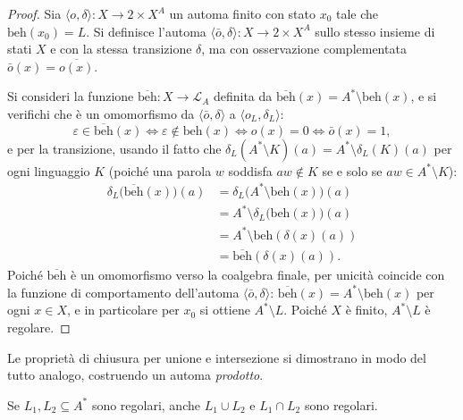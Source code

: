 \begin{proof}
  Sia \(\langle o, \delta \rangle : X \to 2 \times X^A\) un automa finito con stato \(x_0\) tale che \(\mathrm{beh}(x_0) = L\). Si definisce l'automa \(\langle \bar{o}, \delta \rangle : X \to 2 \times X^A\) sullo stesso insieme di stati \(X\) e con la stessa transizione \(\delta\), ma con osservazione complementata \(\bar{o}(x) = \overline{o(x)}\).

  Si consideri la funzione \(\overline{\mathrm{beh}} : X \to \mathcal{L}_A\) definita da \(\overline{\mathrm{beh}}(x) = A^* \setminus \mathrm{beh}(x)\), e si verifichi che è un omomorfismo da \(\langle \bar o, \delta \rangle\) a \(\langle o_L, \delta_L \rangle\):
  \[
    \varepsilon \in \overline{\mathrm{beh}}(x) \iff \varepsilon \notin \mathrm{beh}(x) \iff o(x) = 0 \iff \bar{o}(x) = 1,
  \]
  e per la transizione, usando il fatto che \(\delta_L(A^* \setminus K)(a) = A^* \setminus \delta_L(K)(a)\) per ogni linguaggio \(K\) (poiché una parola \(w\) soddisfa \(aw \notin K\) se e solo se \(aw \in A^* \setminus K\)):
  \[
    \begin{aligned}
      \delta_L\bigl(\overline{\mathrm{beh}}(x)\bigr)(a) & = \delta_L\bigl(A^* \setminus \mathrm{beh}(x)\bigr)(a) \\
                                                        & = A^* \setminus \delta_L\bigl(\mathrm{beh}(x)\bigr)(a) \\
                                                        & = A^* \setminus \mathrm{beh}(\delta(x)(a))             \\
                                                        & = \overline{\mathrm{beh}}(\delta(x)(a)).
    \end{aligned}
  \]
  Poiché \(\overline{\mathrm{beh}}\) è un omomorfismo verso la coalgebra finale, per unicità coincide con la funzione di comportamento dell'automa \(\langle \bar o, \delta \rangle\): \(\overline{\mathrm{beh}}(x) = A^* \setminus \mathrm{beh}(x)\) per ogni \(x \in X\), e in particolare per \(x_0\) si ottiene \(A^* \setminus L\). Poiché \(X\) è finito, \(A^* \setminus L\) è regolare.
\end{proof}

Le proprietà di chiusura per unione e intersezione si dimostrano in modo del tutto analogo, costruendo un automa \textit{prodotto}.

\begin{proposition}
  Se \(L_1, L_2 \subseteq A^*\) sono regolari, anche \(L_1 \cup L_2\) e \(L_1 \cap L_2\) sono regolari.
\end{proposition}

